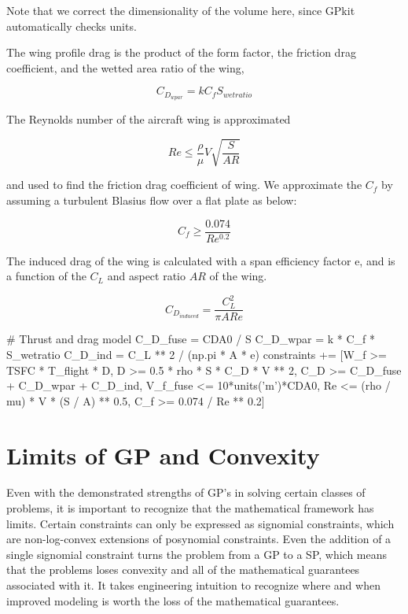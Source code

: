 Note that we correct the dimensionality of the volume here, since GPkit automatically checks units. 

The wing profile drag is the product of the form factor, the friction drag coefficient, and the wetted area ratio of the wing, 

\begin{equation}
    C_{D_{wpar}} = k C_f S_{wetratio}
\label{e:cdwpar}
\end{equation}

The Reynolds number of the aircraft wing is approximated

\begin{equation}
    Re \leq \frac{\rho}{\mu} V \sqrt{\frac{S}{AR}}
\label{e:re}
\end{equation}

and used to find the friction drag coefficient of wing. We approximate the $C_f$ by assuming a turbulent Blasius flow over a flat plate as below:

\begin{equation}
    C_f \geq \frac{0.074} {Re^{0.2}}
\end{equation}

The induced drag of the wing is calculated with a span efficiency factor e, and is a function of the $C_L$ and aspect ratio $AR$ of the wing.

\begin{equation}
    C_{D_{induced}} = \frac{C_L^2}{\pi AR e}
\label{e:cdinduced}
\end{equation}

\begin{python}
        # Thrust and drag model
        C_D_fuse = CDA0 / S
        C_D_wpar = k * C_f * S_wetratio
        C_D_ind  = C_L ** 2 / (np.pi * A * e)
        constraints += [W_f >= TSFC * T_flight * D,
                    D >= 0.5 * rho * S * C_D * V ** 2,
                    C_D >= C_D_fuse + C_D_wpar + C_D_ind,
                    V_f_fuse <= 10*units('m')*CDA0,
                    Re <= (rho / mu) * V * (S / A) ** 0.5,
                    C_f >= 0.074 / Re ** 0.2]
\end{python}


\section{Limits of GP and Convexity} \label{sec:GPLimits}

Even with the demonstrated strengths of \gls{GP}'s in solving certain classes of 
problems, it is important to recognize that the mathematical framework has limits. 
Certain constraints can only be expressed as signomial constraints, which are 
non-log-convex extensions of posynomial constraints. Even the addition of a single 
signomial constraint turns the problem from a \gls{GP} to a \gls{SP}, which means 
that the problems loses convexity and all of the mathematical guarantees associated with it. 
It takes engineering intuition to recognize where and when improved modeling is worth
the loss of the mathematical guarantees.

